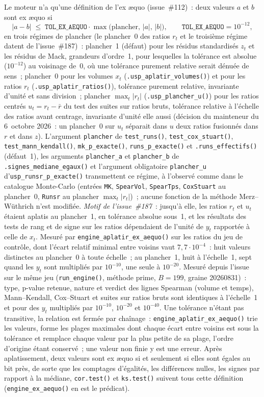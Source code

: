 \documentclass[a4paper,11pt]{article}
\newcommand{\code}[1]{\texttt{\small #1}}
\begin{document}
Le moteur n'a qu'une définition de l'ex \ae quo (issue~\#112)~: deux valeurs $a$ et $b$ sont ex
\ae quo si
\[
  |a - b| \;\le\; \texttt{TOL\_EX\_AEQUO} \cdot \max\big(\text{plancher},\, |a|,\, |b|\big),
  \qquad \texttt{TOL\_EX\_AEQUO} = 10^{-12},
\]
en trois régimes de plancher (le plancher~0 des ratios $r_t$ et le troisième régime datent de
l'issue~\#187)~: plancher~1 (défaut) pour les résidus standardisés $z_t$ et les résidus de Mack,
grandeurs d'ordre~1, pour lesquelles la tolérance est absolue ($10^{-12}$) au voisinage de~0, où
une tolérance purement relative serait dénuée de sens~; plancher~0 pour les volumes $x_t$
(\code{.usp\_aplatir\_volumes()}) et pour les ratios $r_t$ (\code{.usp\_aplatir\_ratios()}),
tolérance purement relative, invariante d'unité et sans division~; plancher $\max_t|r_t|$
(\code{.usp\_plancher\_u()}) pour les ratios centrés $u_t = r_t - \bar r$ du test des suites sur
ratios bruts, tolérance relative à l'échelle des ratios avant centrage, invariante d'unité elle
aussi (décision du mainteneur du 6~octobre 2026~: un plancher~0 sur $u_t$ séparait dans $u$ deux
ratios fusionnés dans $r$ et dans $z$). L'argument \code{plancher} de \code{test\_runs()},
\code{test\_cox\_stuart()}, \code{test\_mann\_kendall()}, \code{mk\_p\_exacte()},
\code{runs\_p\_exacte()} et \code{.runs\_effectifs()} (défaut~1), les arguments
\code{plancher\_a} et \code{plancher\_b} de \code{.signes\_mediane\_egaux()} et l'argument
obligatoire \code{plancher\_u} d'\code{usp\_runsr\_p\_exacte()} transmettent ce régime, à
l'observé comme dans le catalogue Monte-Carlo (entrées \code{MK}, \code{SpearVol},
\code{SpearTps}, \code{CoxStuart} au plancher~0, \code{Runsr} au plancher $\max_t|r_t|$)~; aucune
fonction de la méthode Merz--Wüthrich n'est modifiée. \emph{Motif de l'issue~\#187}~: jusqu'à
elle, les ratios $r_t$ et $u_t$ étaient aplatis au plancher~1, en tolérance absolue sous~1, et les
résultats des tests de rang et de signe sur les ratios dépendaient de l'unité de $y_t$ rapportée à
celle de $x_t$. Mesuré par \code{engine\_aplatir\_ex\_aequo()} sur les ratios du jeu de contrôle,
dont l'écart relatif minimal entre voisins vaut $7{,}7\cdot 10^{-4}$~: huit valeurs distinctes au
plancher~0 à toute échelle~; au plancher~1, huit à l'échelle~1, sept quand les $y_t$ sont
multipliés par $10^{-10}$, une seule à $10^{-20}$. Mesuré depuis l'issue sur le même jeu
(\code{run\_engine()}, méthode prime, $B = 199$, graine 20260831)~: type, p-value retenue, nature et
verdict des lignes Spearman (volume et temps), Mann--Kendall, Cox--Stuart et suites sur ratios
bruts sont identiques à l'échelle~1 et pour des $y_t$ multipliés par $10^{-10}$, $10^{-20}$ et
$10^{-40}$. Une tolérance n'étant pas transitive, la
relation est fermée par chaînage~: \code{engine\_aplatir\_ex\_aequo()} trie les valeurs, forme
les plages maximales dont chaque écart entre voisins est sous la tolérance et remplace chaque
valeur par la plus petite de sa plage, l'ordre d'origine étant conservé~; une valeur non finie y
est une erreur. Après aplatissement, deux valeurs sont ex \ae quo si et seulement si elles sont
égales au bit près, de sorte que les comptages d'égalités, les différences nulles, les signes par
rapport à la médiane, \code{cor.test()} et \code{ks.test()} suivent tous cette définition
(\code{engine\_ex\_aequo()} en est le prédicat).
\end{document}
